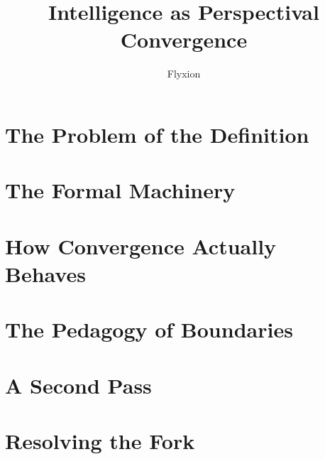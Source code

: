 \documentclass[11pt,oneside]{book}
\title{\Huge Intelligence as Perspectival Convergence}
\author{Flyxion}
\date{}
\theoremstyle{plain}
\theoremstyle{definition}
\theoremstyle{remark}
\begin{document}
\frontmatter
\maketitle

\tableofcontents



\mainmatter

\part{The Problem of the Definition}



\part{The Formal Machinery}




\part{How Convergence Actually Behaves}




\part{The Pedagogy of Boundaries}






\part{A Second Pass}



\part{Resolving the Fork}




\appendix


\end{document}
